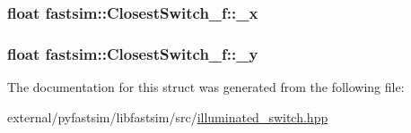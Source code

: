 \subsubsection[{\texorpdfstring{\+\_\+x}{_x}}]{\setlength{\rightskip}{0pt plus 5cm}float fastsim\+::\+Closest\+Switch\+\_\+f\+::\+\_\+x}\hypertarget{structfastsim_1_1_closest_switch__f_ad5bd2786669e4668df4382d5b55683c9}{}\label{structfastsim_1_1_closest_switch__f_ad5bd2786669e4668df4382d5b55683c9}
\subsubsection[{\texorpdfstring{\+\_\+y}{_y}}]{\setlength{\rightskip}{0pt plus 5cm}float fastsim\+::\+Closest\+Switch\+\_\+f\+::\+\_\+y}\hypertarget{structfastsim_1_1_closest_switch__f_a917691e2d4e0dba8405e73242b0edcfe}{}\label{structfastsim_1_1_closest_switch__f_a917691e2d4e0dba8405e73242b0edcfe}


The documentation for this struct was generated from the following file\+:\begin{DoxyCompactItemize}
\item 
external/pyfastsim/libfastsim/src/\hyperlink{illuminated__switch_8hpp}{illuminated\+\_\+switch.\+hpp}\end{DoxyCompactItemize}
